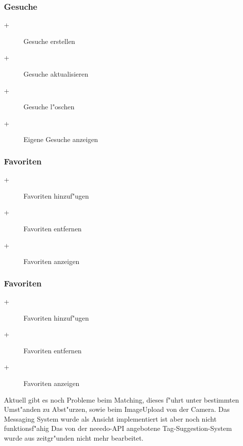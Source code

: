 \subsubsection*{Gesuche}
\begin{description}
\item [+]Gesuche erstellen \vspace{-0,2cm}
\item [+]Gesuche aktualisieren \vspace{-0,2cm}
\item [+]Gesuche l"oschen \vspace{-0,2cm}
\item [+]Eigene Gesuche anzeigen \vspace{-0,2cm}
\end{description}

\subsubsection*{Favoriten}
\begin{description}
\item [+]Favoriten hinzuf"ugen \vspace{-0,2cm}
\item [+]Favoriten entfernen \vspace{-0,2cm}
\item [+]Favoriten anzeigen \vspace{-0,2cm}
\end{description}

\subsubsection*{Favoriten}
\begin{description}
\item [+]Favoriten hinzuf"ugen \vspace{-0,2cm}
\item [+]Favoriten entfernen \vspace{-0,2cm}
\item [+]Favoriten anzeigen \vspace{-0,2cm}
\end{description}

Aktuell gibt es noch Probleme beim Matching, dieses f"uhrt unter bestimmten Umst"anden zu Abst"urzen, sowie beim ImageUpload von der Camera. 
Das Messaging System wurde als Ansicht implementiert ist aber noch nicht funktionsf"ahig 
Das von der neeedo-API angebotene Tag-Suggestion-System wurde aus zeitgr"unden nicht mehr bearbeitet. 

